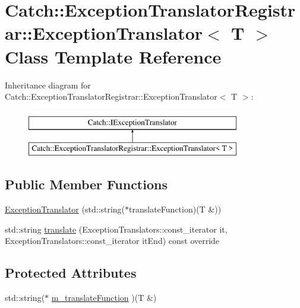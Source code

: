 \hypertarget{class_catch_1_1_exception_translator_registrar_1_1_exception_translator}{}\section{Catch\+::Exception\+Translator\+Registrar\+::Exception\+Translator$<$ T $>$ Class Template Reference}
\label{class_catch_1_1_exception_translator_registrar_1_1_exception_translator}
Inheritance diagram for Catch\+::Exception\+Translator\+Registrar\+::Exception\+Translator$<$ T $>$\+:\begin{figure}[H]
\begin{center}
\leavevmode
\includegraphics[height=2.000000cm]{class_catch_1_1_exception_translator_registrar_1_1_exception_translator}
\end{center}
\end{figure}
\subsection*{Public Member Functions}
\begin{DoxyCompactItemize}
\item 
\mbox{\hyperlink{class_catch_1_1_exception_translator_registrar_1_1_exception_translator_a2de4e9bcaad47996159763e69f614d7a}{Exception\+Translator}} (std\+::string($\ast$translate\+Function)(T \&))
\item 
std\+::string \mbox{\hyperlink{class_catch_1_1_exception_translator_registrar_1_1_exception_translator_a29e85940ee9ce719f26e43550cb4ed48}{translate}} (Exception\+Translators\+::const\+\_\+iterator it, Exception\+Translators\+::const\+\_\+iterator it\+End) const override
\end{DoxyCompactItemize}
\subsection*{Protected Attributes}
\begin{DoxyCompactItemize}
\item 
std\+::string($\ast$ \mbox{\hyperlink{class_catch_1_1_exception_translator_registrar_1_1_exception_translator_a488013ff0869785c9d041443fbf9a757}{m\+\_\+translate\+Function}} )(T \&)
\end{DoxyCompactItemize}


